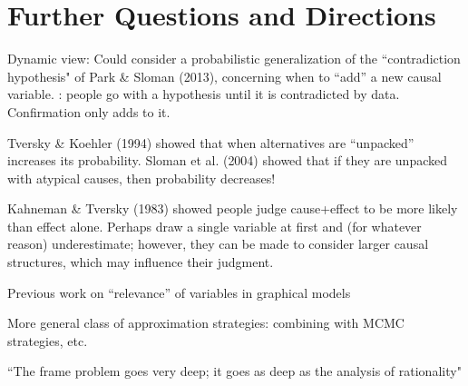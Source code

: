 \documentclass[10pt,letterpaper]{article}
\begin{document}
\section{Further Questions and Directions}


Dynamic view: Could consider a probabilistic generalization of the ``contradiction hypothesis" of Park \& Sloman (2013), concerning when to ``add'' a new causal variable. \cite{KlaymanHa}: people go with a hypothesis until it is contradicted by data. Confirmation only adds to it.

Tversky \& Koehler (1994) showed that when alternatives are ``unpacked'' increases its probability. Sloman et al. (2004) showed that if they are unpacked with atypical causes, then probability decreases!

Kahneman \& Tversky (1983) showed people judge cause+effect to be more likely than effect alone. Perhaps draw a single variable at first and (for whatever reason) underestimate; however, they can be made to consider larger causal structures, which may influence their judgment. 

Previous work on ``relevance'' of variables in graphical models \citep{Druzdzel}


More general class of approximation strategies: combining with MCMC strategies, etc. \citep{WickMcCallum}

``The frame problem goes very deep; it goes as deep as the analysis of rationality" \citep{Fodor1987}





\end{document}
